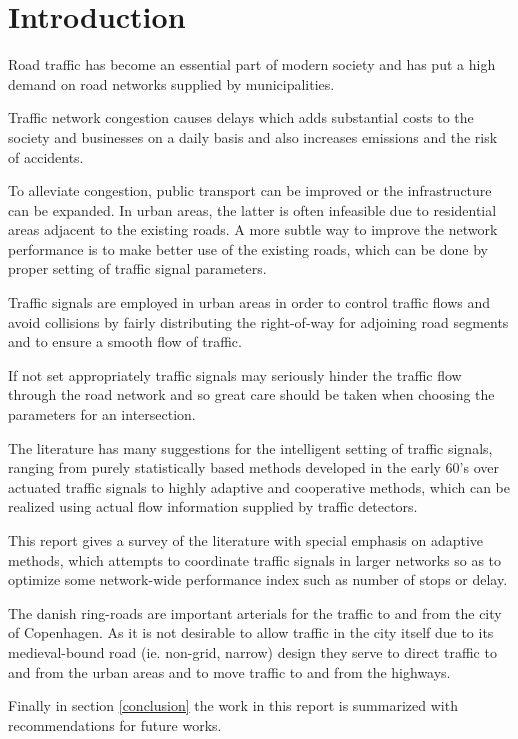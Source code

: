 \section{Introduction}
Road traffic has become an essential part of modern society and has put a high demand on road networks supplied by municipalities. 

Traffic network congestion causes delays which adds substantial costs to the society and businesses on a daily basis and also increases emissions and the risk of accidents.

To alleviate congestion, public transport can be improved or the infrastructure can be expanded. In urban areas, the latter is often infeasible due to residential areas adjacent to the existing roads. 
A more subtle way to improve the network performance is to make better use of the existing roads, which can be done by proper setting of traffic signal parameters. 

Traffic signals are employed in urban areas in order to control traffic flows and avoid collisions by fairly distributing the right-of-way for adjoining road segments and to ensure a smooth flow of traffic.

If not set appropriately traffic signals may seriously hinder the traffic flow through the road network and so great care should be taken when choosing the parameters for an intersection. 

The literature has many suggestions for the intelligent setting of traffic signals, ranging from purely statistically based methods developed in the early 60's over actuated traffic signals to highly adaptive and cooperative methods, which can be realized using actual flow information supplied by traffic detectors. 

This report gives a survey of the literature with special emphasis on adaptive methods, which attempts to coordinate traffic signals in larger networks so as to optimize some network-wide performance index such as number of stops or delay. 

The danish ring-roads are important arterials for the traffic 	to and from the city of Copenhagen. As it is not desirable to allow traffic in the city itself due to its medieval-bound road (ie. non-grid, narrow) design they serve to direct traffic to and from the urban areas and to move traffic to and from the highways.

Finally in section \ref{conclusion} the work in this report is summarized with recommendations for future works.